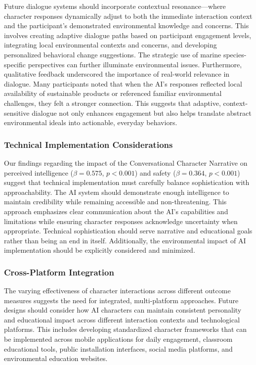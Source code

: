 \documentclass[sigconf, nonacm]{acmart}
\begin{document}
Future dialogue systems should incorporate contextual resonance—where character responses dynamically adjust to both the immediate interaction context and the participant's demonstrated environmental knowledge and concerns. This involves creating adaptive dialogue paths based on participant engagement levels, integrating local environmental contexts and concerns, and developing personalized behavioral change suggestions. The strategic use of marine species-specific perspectives can further illuminate environmental issues. Furthermore, qualitative feedback underscored the importance of real-world relevance in dialogue. Many participants noted that when the AI’s responses reflected local availability of sustainable products or referenced familiar environmental challenges, they felt a stronger connection. This suggests that adaptive, context-sensitive dialogue not only enhances engagement but also helps translate abstract environmental ideals into actionable, everyday behaviors.

\subsubsection*{Technical Implementation Considerations}
Our findings regarding the impact of the Conversational Character Narrative on perceived intelligence ($\beta = 0.575$, $p < 0.001$) and safety ($\beta = 0.364$, $p < 0.001$) suggest that technical implementation must carefully balance sophistication with approachability. The AI system should demonstrate enough intelligence to maintain credibility while remaining accessible and non-threatening. This approach emphasizes clear communication about the AI's capabilities and limitations while ensuring character responses acknowledge uncertainty when appropriate. Technical sophistication should serve narrative and educational goals rather than being an end in itself. Additionally, the environmental impact of AI implementation should be explicitly considered and minimized.

\subsubsection*{Cross-Platform Integration}
The varying effectiveness of character interactions across different outcome measures suggests the need for integrated, multi-platform approaches. Future designs should consider how AI characters can maintain consistent personality and educational impact across different interaction contexts and technological platforms. This includes developing standardized character frameworks that can be implemented across mobile applications for daily engagement, classroom educational tools, public installation interfaces, social media platforms, and environmental education websites.
\end{document}
